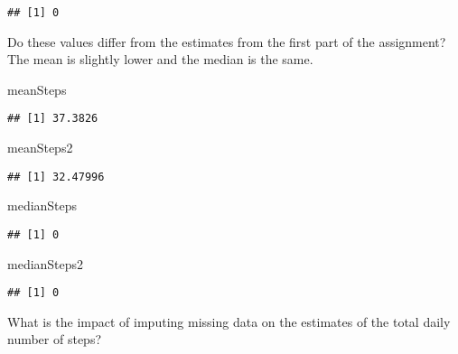 \documentclass[
]{article}
\newenvironment{Shaded}{\begin{snugshade}}{\end{snugshade}}
\newcommand{\AttributeTok}[1]{\textcolor[rgb]{0.77,0.63,0.00}{#1}}
\newcommand{\ConstantTok}[1]{\textcolor[rgb]{0.00,0.00,0.00}{#1}}
\newcommand{\FunctionTok}[1]{\textcolor[rgb]{0.00,0.00,0.00}{#1}}
\newcommand{\NormalTok}[1]{#1}
\newcommand{\OtherTok}[1]{\textcolor[rgb]{0.56,0.35,0.01}{#1}}
\newcommand{\SpecialCharTok}[1]{\textcolor[rgb]{0.00,0.00,0.00}{#1}}
\begin{document}
\begin{verbatim}
## [1] 0
\end{verbatim}

Do these values differ from the estimates from the first part of the
assignment? The mean is slightly lower and the median is the same.

\begin{Shaded}
\begin{Highlighting}[]
\NormalTok{meanSteps}
\end{Highlighting}
\end{Shaded}

\begin{verbatim}
## [1] 37.3826
\end{verbatim}

\begin{Shaded}
\begin{Highlighting}[]
\NormalTok{meanSteps2}
\end{Highlighting}
\end{Shaded}

\begin{verbatim}
## [1] 32.47996
\end{verbatim}

\begin{Shaded}
\begin{Highlighting}[]
\NormalTok{medianSteps}
\end{Highlighting}
\end{Shaded}

\begin{verbatim}
## [1] 0
\end{verbatim}

\begin{Shaded}
\begin{Highlighting}[]
\NormalTok{medianSteps2}
\end{Highlighting}
\end{Shaded}

\begin{verbatim}
## [1] 0
\end{verbatim}

What is the impact of imputing missing data on the estimates of the
total daily number of steps?

\begin{Shaded}
\end{Shaded}
\end{document}

